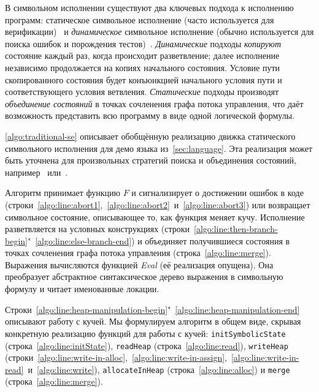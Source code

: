 В символьном исполнении существуют два ключевых подхода к исполнению программ: статическое символьное исполнение (часто используется для верификации)~\cite{koelbl2005constructing,babic2008calysto,dillig2008sound,xie2005scalable} и \emph{динамическое} символьное исполнение (обычно используется для поиска ошибок и порождения тестов)~\cite{tillmann2008pex,godefroid2005dart,bounimova2013billions}. \emph{Динамические} подходы \emph{копируют} состояние каждый раз, когда происходит разветвление; далее исполнение независимо продолжается на копиях начального состояния. Условие пути скопированного состояния будет конъюнкцией начального условия пути и соответствующего условия ветвления. \emph{Статические} подходы производят \emph{объединение состояний} в точках сочленения графа потока управления, что даёт возможность представить всю программу в виде одной логической формулы.

\traditionalalgo

\autoref{algo:traditional-se} описывает обобщённую реализацию движка статического символьного исполнения для демо языка из~\autoref{sec:language}. Эта реализация может быть уточнена для произвольных стратегий поиска и объединения состояний, например~\cite{kuznetsov2012efficient} или~\cite{avgerinos2014enhancing}.

Алгоритм принимает функцию $F$ и сигнализирует о достижении ошибок в коде (строки~\ref{algo:line:abort1},~\ref{algo:line:abort2}~и~\ref{algo:line:abort3}) или возвращает символьное состояние, описывающее то, как функция меняет кучу. Исполнение разветвляется на условных конструкциях (строки~\ref{algo:line:then-branch-begin}"~\ref{algo:line:else-branch-end}) и объединяет получившиеся состояния в точках сочленения графа потока управления (строка~\ref{algo:line:merge}). Выражения вычисляются функцией \emph{Eval} (её реализация опущена). Она преобразует абстрактное синтаксическое дерево выражения в символьную формулу и читает именованные локации.

Строки~\ref{algo:line:heap-manipulation-begin}"~\ref{algo:line:heap-manipulation-end} описывают работу с кучей. Мы формулируем алгоритм в общем виде, скрывая конкретную реализацию функций для работы с кучей: \texttt{initSymbolicState} (строка~\ref{algo:line:initState}), \texttt{readHeap} (строка~\ref{algo:line:read}), \texttt{writeHeap} (строки~\ref{algo:line:write-in-alloc},~\ref{algo:line:write-in-assign},~\ref{algo:line:write-in-read}~и~\ref{algo:line:write}), \texttt{allocateInHeap} (строка~\ref{algo:line:alloc}) и \texttt{merge} (строка~\ref{algo:line:merge}).

